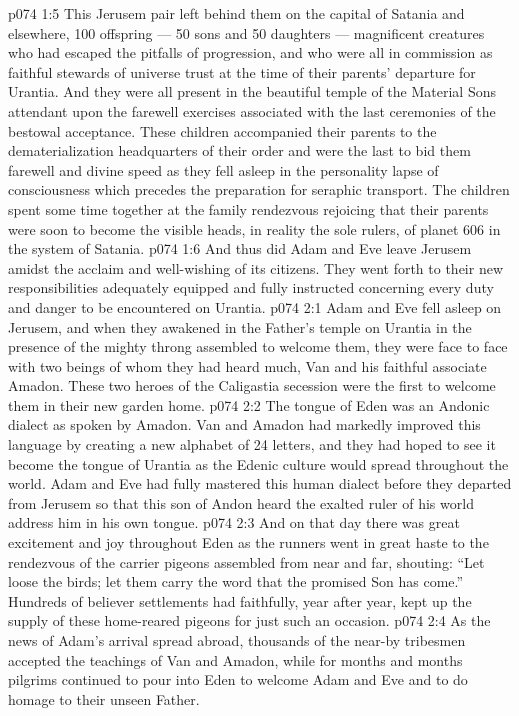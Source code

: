 \vs p074 1:5 \pc This Jerusem pair left behind them on the capital of Satania and elsewhere, 100 offspring --- 50 sons and 50 daughters --- magnificent creatures who had escaped the pitfalls of progression, and who were all in commission as faithful stewards of universe trust at the time of their parents’ departure for Urantia. And they were all present in the beautiful temple of the Material Sons attendant upon the farewell exercises associated with the last ceremonies of the bestowal acceptance. These children accompanied their parents to the dematerialization headquarters of their order and were the last to bid them farewell and divine speed as they fell asleep in the personality lapse of consciousness which precedes the preparation for seraphic transport. The children spent some time together at the family rendezvous rejoicing that their parents were soon to become the visible heads, in reality the sole rulers, of planet 606 in the system of Satania.
\vs p074 1:6 And thus did Adam and Eve leave Jerusem amidst the acclaim and well\hyp{}wishing of its citizens. They went forth to their new responsibilities adequately equipped and fully instructed concerning every duty and danger to be encountered on Urantia.
\vs p074 2:1 Adam and Eve fell asleep on Jerusem, and when they awakened in the Father’s temple on Urantia in the presence of the mighty throng assembled to welcome them, they were face to face with two beings of whom they had heard much, Van and his faithful associate Amadon. These two heroes of the Caligastia secession were the first to welcome them in their new garden home.
\vs p074 2:2 The tongue of Eden was an Andonic dialect as spoken by Amadon. Van and Amadon had markedly improved this language by creating a new alphabet of 24 letters, and they had hoped to see it become the tongue of Urantia as the Edenic culture would spread throughout the world. Adam and Eve had fully mastered this human dialect before they departed from Jerusem so that this son of Andon heard the exalted ruler of his world address him in his own tongue.
\vs p074 2:3 And on that day there was great excitement and joy throughout Eden as the runners went in great haste to the rendezvous of the carrier pigeons assembled from near and far, shouting: “Let loose the birds; let them carry the word that the promised Son has come.” Hundreds of believer settlements had faithfully, year after year, kept up the supply of these home\hyp{}reared pigeons for just such an occasion.
\vs p074 2:4 \pc As the news of Adam’s arrival spread abroad, thousands of the near-by tribesmen accepted the teachings of Van and Amadon, while for months and months pilgrims continued to pour into Eden to welcome Adam and Eve and to do homage to their unseen Father.
